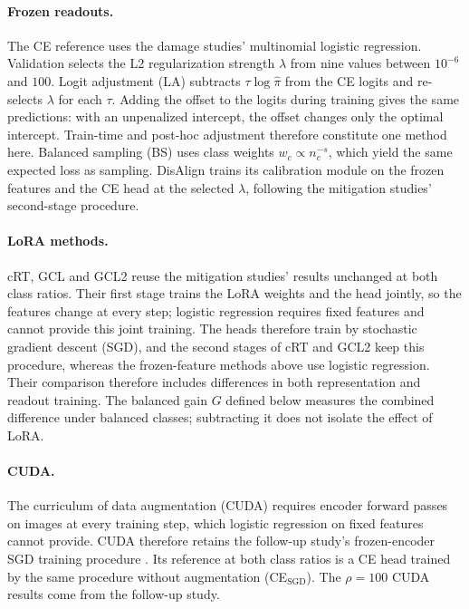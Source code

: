 \documentclass[11pt]{article}
\begin{document}
\paragraph{Frozen readouts.}
The CE reference uses the damage studies' multinomial logistic regression. Validation selects the L2 regularization strength $\lambda$ from nine values between $10^{-6}$ and $100$. Logit adjustment (LA) \citep{menon2021longTail} subtracts $\tau\log\hat\pi$ from the CE logits and re-selects $\lambda$ for each $\tau$. Adding the offset to the logits during training gives the same predictions: with an unpenalized intercept, the offset changes only the optimal intercept. Train-time and post-hoc adjustment therefore constitute one method here. Balanced sampling (BS) uses class weights $w_c\propto n_c^{-s}$, which yield the same expected loss as sampling. DisAlign \citep{zhang2021distributionAlignment} trains its calibration module on the frozen features and the CE head at the selected $\lambda$, following the mitigation studies' second-stage procedure.

\paragraph{LoRA methods.}
cRT, GCL and GCL2 reuse the mitigation studies' results unchanged at both class ratios. Their first stage trains the LoRA weights and the head jointly, so the features change at every step; logistic regression requires fixed features and cannot provide this joint training. The heads therefore train by stochastic gradient descent (SGD), and the second stages of cRT and GCL2 keep this procedure, whereas the frozen-feature methods above use logistic regression. Their comparison therefore includes differences in both representation and readout training. The balanced gain $G$ defined below measures the combined difference under balanced classes; subtracting it does not isolate the effect of LoRA.

\paragraph{CUDA.}
The curriculum of data augmentation (CUDA) \citep{ahn2023cuda} requires encoder forward passes on images at every training step, which logistic regression on fixed features cannot provide. CUDA therefore retains the follow-up study's frozen-encoder SGD training procedure \citep{queisler2026loraAblation}. Its reference at both class ratios is a CE head trained by the same procedure without augmentation (CE$_\mathrm{SGD}$). The $\rho=100$ CUDA results come from the follow-up study.
\end{document}

